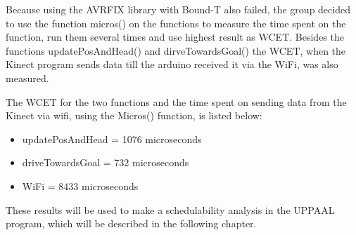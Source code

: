 Because using the AVRFIX library with Bound-T also failed, the group decided to use the function micros() on the functions to measure the time spent on the function, run them several times and use highest result as WCET. Besides the functions updatePosAndHead() and dirveTowardsGoal() the WCET, when the Kinect program sends data till the arduino received it via the WiFi, was also measured. 

The WCET for the two functions and the time spent on sending data from the Kinect via wifi, using the Micros() function, is listed below:
\begin{itemize}
	\item updatePosAndHead = 1076 microseconds
	\item driveTowardsGoal = 732 microseconds
	\item WiFi = 8433 microseconds
\end{itemize}

These results will be used to make a schedulability analysis in the UPPAAL program, which will be described in the following chapter.
